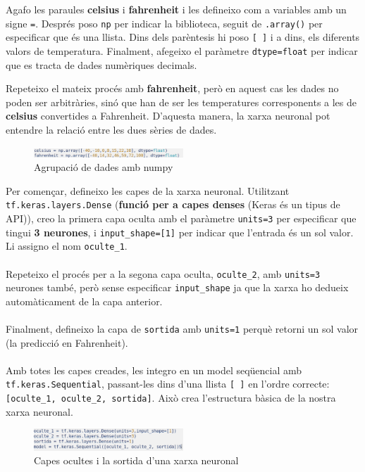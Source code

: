 Agafo les paraules \textbf{celsius} i \textbf{fahrenheit} i les defineixo com a variables amb un signe \texttt{=}. Després poso \texttt{np} per indicar la biblioteca, seguit de \texttt{.array()} per especificar que és una llista. Dins dels parèntesis hi poso \texttt{[ ]} i a dins, els diferents valors de temperatura. Finalment, afegeixo el paràmetre \texttt{dtype=float} per indicar que es tracta de dades numèriques decimals.

Repeteixo el mateix procés amb \textbf{fahrenheit}, però en aquest cas les dades no poden ser arbitràries, sinó que han de ser les temperatures corresponents a les de \textbf{celsius} convertides a Fahrenheit. D’aquesta manera, la xarxa neuronal pot entendre la relació entre les dues sèries de dades.


\begin{figure}[H]
    \centering
    \includegraphics[width=0.5\textwidth]{./figures/2.png}
    \caption{Agrupació de dades amb numpy}
\end{figure}

Per començar, defineixo les capes de la xarxa neuronal. Utilitzant \texttt{tf.keras.layers.Dense} (\textbf{funció per a capes denses} (Keras és un tipus de API)), creo la primera capa oculta amb el paràmetre \texttt{units=3} per especificar que tingui \textbf{3 neurones}, i \texttt{input\_shape=[1]} per indicar que l'entrada és un sol valor. Li assigno el nom \texttt{oculte\_1}.\\ \\
Repeteixo el procés per a la segona capa oculta, \texttt{oculte\_2}, amb \texttt{units=3} neurones també, però sense especificar \texttt{input\_shape} ja que la xarxa ho dedueix automàticament de la capa anterior.\\ \\
Finalment, defineixo la capa de \texttt{sortida} amb \texttt{units=1} perquè retorni un sol valor (la predicció en Fahrenheit).\\ \\
Amb totes les capes creades, les integro en un model seqüencial amb \texttt{tf.keras.Sequential}, passant-les dins d'una llista \texttt{[ ]} en l'ordre correcte: \texttt{[oculte\_1, oculte\_2, sortida]}. Això crea l'estructura bàsica de la nostra xarxa neuronal.


\begin{figure}[H]
    \centering
    \includegraphics[width=0.5\textwidth]{./figures/3.png}
    \caption{Capes ocultes i la sortida d'una xarxa neuronal}
\end{figure}


